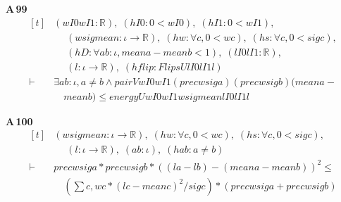 \noindent\textbf{A\,99}\quad{}
{\footnotesize\[ \begin{aligned}[t]
&(\mathit{wI0} \mathit{wI1} : \mathbb{R} ),\; (\mathit{hI0} : 0 < \mathit{wI0}),\; (\mathit{hI1} : 0 < \mathit{wI1}),\\
&\quad \; (\mathit{w} \mathit{sig} \mathit{mean} : \iota \to \mathbb{R} ),\; (\mathit{hw} : \forall \mathit{c}, 0 < \mathit{w} \mathit{c}),\; (\mathit{hs} : \forall \mathit{c}, 0 < \mathit{sig} \mathit{c}),\\
&\quad \; (\mathit{hD} : \forall \mathit{a} \mathit{b} : \iota , \mathit{mean} \mathit{a} - \mathit{mean} \mathit{b} < 1),\; (\mathit{lI0} \mathit{lI1} : \mathbb{R} ),\\
&\quad \; (\mathit{l} : \iota \to \mathbb{R} ),\; (\mathit{hflip} : \mathit{FlipsU} \mathit{lI0} \mathit{lI1} \mathit{l})\\
\vdash\;&\exists \mathit{a} \mathit{b} : \iota , \mathit{a} \neq \mathit{b} \wedge \mathit{pairV} \mathit{wI0} \mathit{wI1} (\mathit{prec} \mathit{w} \mathit{sig} \mathit{a}) (\mathit{prec} \mathit{w} \mathit{sig} \mathit{b}) (\mathit{mean} \mathit{a} -\\
&\quad \mathit{mean} \mathit{b}) \leq \mathit{energyU} \mathit{wI0} \mathit{wI1} \mathit{w} \mathit{sig} \mathit{mean} \mathit{lI0} \mathit{lI1} \mathit{l}
\end{aligned} \]}

\noindent\textbf{A\,100}\quad{}
{\footnotesize\[ \begin{aligned}[t]
&(\mathit{w} \mathit{sig} \mathit{mean} : \iota \to \mathbb{R} ),\; (\mathit{hw} : \forall \mathit{c}, 0 < \mathit{w} \mathit{c}),\; (\mathit{hs} : \forall \mathit{c}, 0 < \mathit{sig} \mathit{c}),\\
&\quad \; (\mathit{l} : \iota \to \mathbb{R} ),\; (\mathit{a} \mathit{b} : \iota ),\; (\mathit{hab} : \mathit{a} \neq \mathit{b})\\
\vdash\;&\mathit{prec} \mathit{w} \mathit{sig} \mathit{a}*\mathit{prec} \mathit{w} \mathit{sig} \mathit{b}*((\mathit{l} \mathit{a} - \mathit{l} \mathit{b}) - (\mathit{mean} \mathit{a} - \mathit{mean} \mathit{b}))^{2} \leq\\
&\quad (\textstyle\sum \mathit{c}, \mathit{w} \mathit{c}*(\mathit{l} \mathit{c} - \mathit{mean} \mathit{c})^{2}/\mathit{sig} \mathit{c})*(\mathit{prec} \mathit{w} \mathit{sig} \mathit{a} + \mathit{prec} \mathit{w} \mathit{sig} \mathit{b})
\end{aligned} \]}


